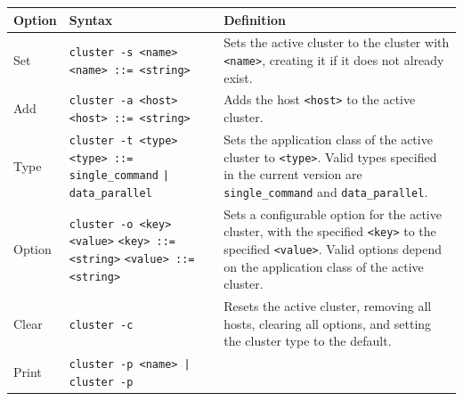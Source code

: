 \documentclass[twoside]{report}
\begin{document}
\begin{table}
  \begin{center}
    \begin{tabularx}{\textwidth}{|l|X|X|}
      \hline
      Option                        & Syntax                                                                                                                                                                                       & Definition                                                                                                        \\ \hline
      Set                           & \texttt{cluster -s <name>} \newline
      \texttt{<name> ::= <string>}  & Sets the active cluster to the cluster with \texttt{<name>}, creating it if it does not already exist.
      \\ \hline
      Add                           & \texttt{cluster -a <host>} \newline
      \texttt{<host> ::= <string>}  & Adds the host \texttt{<host>} to the active cluster.
      \\ \hline
      Type                          & \texttt{cluster -t <type>} \newline
      \texttt{<type> ::= single\_command} \newline
      \texttt{| data\_parallel}     & Sets the application class of the active cluster to \texttt{<type>}. Valid types specified in the current version are \texttt{single\_command} and \texttt{data\_parallel}.
      \\ \hline
      Option                        & \texttt{cluster -o <key> <value>} \newline
      \texttt{<key> ::= <string>} \newline
      \texttt{<value> ::= <string>} & Sets a configurable option for the active cluster, with the specified \texttt{<key>} to the specified \texttt{<value>}. Valid options depend on the application class of the active cluster.
      \\ \hline
      Clear                         & \texttt{cluster -c}                                                                                                                                                                          & Resets the active cluster, removing all hosts, clearing all options, and setting the cluster type to the default.
      \\ \hline
      Print                         & \texttt{cluster -p <name> | cluster -p} \newline

\end{tabularx}
\end{center}
\end{table}
\end{document}
